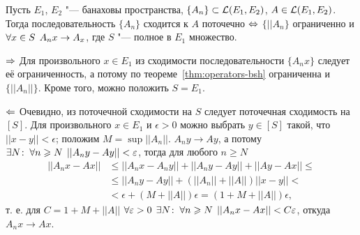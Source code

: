 \documentclass[main]{subfiles}
\begin{document}
\begin{theorem}
  Пусть \( E_1 \), \( E_2 \) "--- банаховы пространства,
  \( \{ A_n \} \subset \Linears{E_1}[E_2] \),
  \( A \in \Linears{E_1}[E_2] \).
  Тогда последовательность \( \{ A_n \} \) сходится
  к \( A \) поточечно \( \Leftrightarrow \)
  \( \{ ||A_n \} \) ограниченно и \( \forall {x \in S} \; \,
  A_n x \to A_x \),
  где \( S \) "--- полное в \( E_1 \) множество.
\end{theorem}
\begin{itemproof}
  \item[\( \Rightarrow \)]
    Для произвольного \( x \in E_1 \)
    из сходимости последовательности
    \( \{ A_n x \} \) следует её ограниченность,
    а потому по теореме~\ref{thm:operators-bsh}
    ограниченна и \( \{ ||A_n|| \} \).
    Кроме того, можно положить \( S = E_1 \).
  \item[\( \Leftarrow \)]
    Очевидно, из поточечной сходимости
    на \( S \) следует поточечная сходимость
    на \( [S] \).
    Для произвольного \( x \in E_1 \) и \( \epsilon > 0 \)
    можно выбрать \( y \in [S] \) такой,
    что \( ||x - y|| < \epsilon \);
    положим \( M = \sup ||A_n|| \).
    \( A_n y \to A y \), а потому
    \( \exists N \colon \: \forall {n \geqslant N} \; \, ||A_n y - A y|| < \varepsilon \),
    тогда для любого \( n \ge N \)
    \begin{align}
      ||A_n x - A x|| &\le
      ||A_n x - A_n y|| + ||A_n y - A y|| + ||A y - A x|| \le \\
      &\le ||A_n y - A y|| + (||A_n|| + ||A||) ||x - y|| < \\
      &< \epsilon + (M  + ||A||) \epsilon =
      (1 + M + ||A||) \epsilon,
    \end{align}
    т. е. для \( C = 1 + M + ||A|| \)
    \( \forall {\varepsilon> 0} \; \, \exists N \colon \:
    \forall {n \geqslant N} \; \, ||A_n x - A x|| < C \varepsilon \),
    откуда \( A_n x \to A x \).
\end{itemproof}
\end{document}
